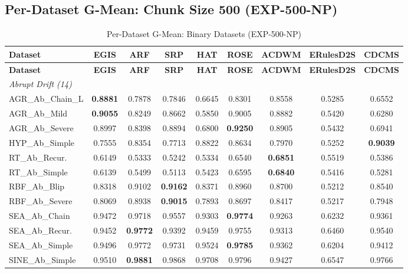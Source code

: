 \documentclass[lettersize,10pt]{article}
\begin{document}
\subsection{Per-Dataset G-Mean: Chunk Size 500 (EXP-500-NP)}
\label{sec:s2_exp_500_np}

\scriptsize
\begin{longtable}{lcccccccc}
\caption{Per-Dataset G-Mean: Binary Datasets (EXP-500-NP)}\label{tab:s_binary_exp_500_np} \\
\toprule
\textbf{Dataset} & \textbf{EGIS} & \textbf{ARF} & \textbf{SRP} & \textbf{HAT} & \textbf{ROSE} & \textbf{ACDWM} & \textbf{ERulesD2S} & \textbf{CDCMS} \\
\midrule
\endfirsthead
\toprule
\textbf{Dataset} & \textbf{EGIS} & \textbf{ARF} & \textbf{SRP} & \textbf{HAT} & \textbf{ROSE} & \textbf{ACDWM} & \textbf{ERulesD2S} & \textbf{CDCMS} \\
\midrule
\endhead
\midrule \multicolumn{9}{l}{\textit{Abrupt Drift (14)}}\\
\midrule
AGR\_Ab\_Chain\_L & \textbf{0.8881} & 0.7878 & 0.7846 & 0.6645 & 0.8301 & 0.8558 & 0.5285 & 0.6552 \\
AGR\_Ab\_Mild & \textbf{0.9055} & 0.8249 & 0.8662 & 0.5850 & 0.9005 & 0.8882 & 0.5420 & 0.6280 \\
AGR\_Ab\_Severe & 0.8997 & 0.8398 & 0.8894 & 0.6800 & \textbf{0.9250} & 0.8905 & 0.5432 & 0.6941 \\
HYP\_Ab\_Simple & 0.7555 & 0.8354 & 0.7713 & 0.8822 & 0.8634 & 0.7970 & 0.5252 & \textbf{0.9039} \\
RT\_Ab\_Recur. & 0.6149 & 0.5333 & 0.5242 & 0.5334 & 0.6540 & \textbf{0.6851} & 0.5519 & 0.5386 \\
RT\_Ab\_Simple & 0.6139 & 0.5499 & 0.5113 & 0.5423 & 0.6595 & \textbf{0.6840} & 0.5416 & 0.5281 \\
RBF\_Ab\_Blip & 0.8318 & 0.9102 & \textbf{0.9162} & 0.8371 & 0.8960 & 0.8700 & 0.5212 & 0.8540 \\
RBF\_Ab\_Severe & 0.8069 & 0.8938 & \textbf{0.9015} & 0.7893 & 0.8697 & 0.8417 & 0.5217 & 0.7948 \\
SEA\_Ab\_Chain & 0.9472 & 0.9718 & 0.9557 & 0.9303 & \textbf{0.9774} & 0.9263 & 0.6232 & 0.9361 \\
SEA\_Ab\_Recur. & 0.9452 & \textbf{0.9772} & 0.9392 & 0.9459 & 0.9755 & 0.9313 & 0.6460 & 0.9540 \\
SEA\_Ab\_Simple & 0.9496 & 0.9772 & 0.9731 & 0.9524 & \textbf{0.9785} & 0.9362 & 0.6204 & 0.9412 \\
SINE\_Ab\_Simple & 0.9510 & \textbf{0.9881} & 0.9868 & 0.9708 & 0.9796 & 0.9427 & 0.6547 & 0.9766 \\

\end{longtable}
\end{document}

